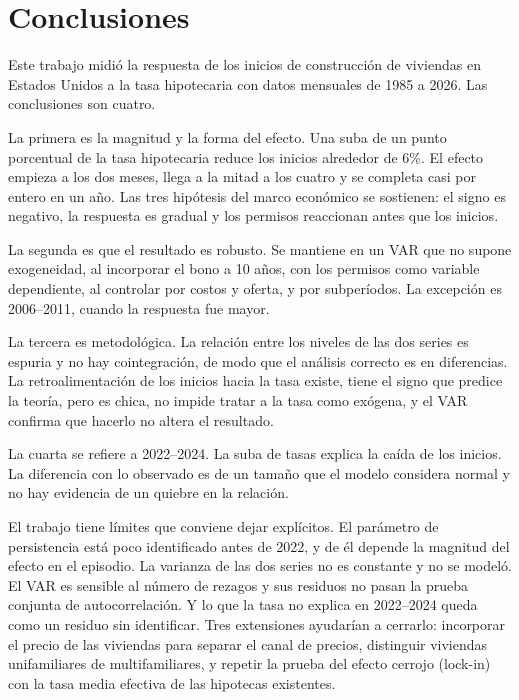 \documentclass[11pt,a4paper]{article}
\begin{document}
\section{Conclusiones}

Este trabajo midió la respuesta de los inicios de construcción de viviendas en Estados Unidos a la tasa hipotecaria con datos mensuales de 1985 a 2026. Las conclusiones son cuatro.

La primera es la magnitud y la forma del efecto. Una suba de un punto porcentual de la tasa hipotecaria reduce los inicios alrededor de 6\%. El efecto empieza a los dos meses, llega a la mitad a los cuatro y se completa casi por entero en un año. Las tres hipótesis del marco económico se sostienen: el signo es negativo, la respuesta es gradual y los permisos reaccionan antes que los inicios.

La segunda es que el resultado es robusto. Se mantiene en un VAR que no supone exogeneidad, al incorporar el bono a 10 años, con los permisos como variable dependiente, al controlar por costos y oferta, y por subperíodos. La excepción es 2006--2011, cuando la respuesta fue mayor.

La tercera es metodológica. La relación entre los niveles de las dos series es espuria y no hay cointegración, de modo que el análisis correcto es en diferencias. La retroalimentación de los inicios hacia la tasa existe, tiene el signo que predice la teoría, pero es chica, no impide tratar a la tasa como exógena, y el VAR confirma que hacerlo no altera el resultado.

La cuarta se refiere a 2022--2024. La suba de tasas explica la caída de los inicios. La diferencia con lo observado es de un tamaño que el modelo considera normal y no hay evidencia de un quiebre en la relación.

El trabajo tiene límites que conviene dejar explícitos. El parámetro de persistencia está poco identificado antes de 2022, y de él depende la magnitud del efecto en el episodio. La varianza de las dos series no es constante y no se modeló. El VAR es sensible al número de rezagos y sus residuos no pasan la prueba conjunta de autocorrelación. Y lo que la tasa no explica en 2022--2024 queda como un residuo sin identificar. Tres extensiones ayudarían a cerrarlo: incorporar el precio de las viviendas para separar el canal de precios, distinguir viviendas unifamiliares de multifamiliares, y repetir la prueba del efecto cerrojo (lock-in) con la tasa media efectiva de las hipotecas existentes.
\end{document}
